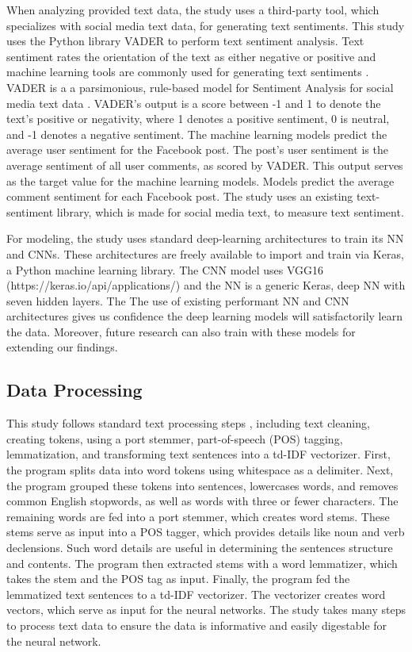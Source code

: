 \documentclass[mksc,blindrev]{informs3} %
\begin{document}
When analyzing provided text data, the study uses a third-party tool, which specializes with social media text data, for generating text sentiments. This study uses the Python library VADER to perform text sentiment analysis. Text sentiment rates the orientation of the text as either negative or positive and machine learning tools are commonly used for generating text sentiments \cite{HADDI201326}.  VADER is a a parsimonious, rule-based model for Sentiment Analysis for social media text data \cite{Gilbert}. VADER's output is a score between -1 and 1 to denote the text's positive or negativity, where 1 denotes a positive sentiment, 0 is neutral, and -1 denotes a negative sentiment. The machine learning models predict the average user sentiment for the Facebook post. The post's user sentiment is the average sentiment of all user comments, as scored by VADER. This output serves as the target value for the machine learning models. Models predict the average comment sentiment for each Facebook post. The study uses an existing text-sentiment library, which is made for social media text, to measure text sentiment.

For modeling, the study uses standard deep-learning architectures to train its NN and CNNs. These architectures are freely available to import and train via Keras, a Python machine learning library. The CNN model uses VGG16 (https://keras.io/api/applications/) and the NN is a generic Keras, deep NN with seven hidden layers. The The use of existing performant NN and CNN architectures gives us confidence the deep learning models will satisfactorily learn the data. Moreover, future research can also train with these models for extending our findings.

\subsection{Data Processing}

This study follows standard text processing steps \cite{Camacho-Collados2019}, including text cleaning, creating tokens, using a port stemmer, part-of-speech (POS) tagging, lemmatization, and transforming text sentences into a td-IDF vectorizer. First, the program splits data into word tokens using whitespace as a delimiter. Next, the program grouped these tokens into sentences, lowercases words, and removes common English stopwords, as well as words with three or fewer characters. The remaining words are fed into a port stemmer, which creates word stems. These stems serve as input into a POS tagger, which provides details like noun and verb declensions. Such word details are useful in determining the sentences structure and contents. The program then extracted stems with a word lemmatizer, which takes the stem and the POS tag as input. Finally, the program fed the lemmatized text sentences to a td-IDF vectorizer. The vectorizer creates word vectors, which serve as input for the neural networks. The study takes many steps to process text data to ensure the data is informative and easily digestable for the neural network.
\end{document}
